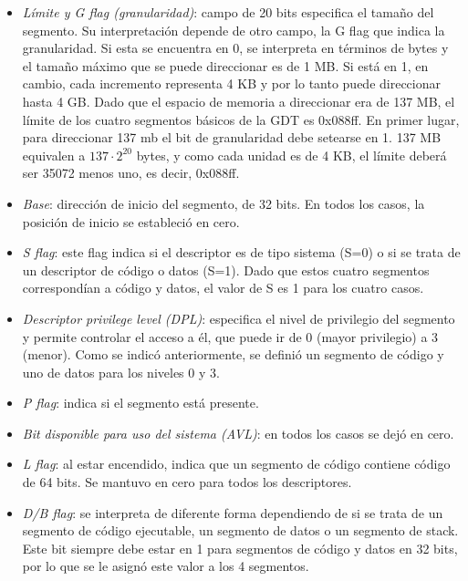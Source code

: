\documentclass[a4paper]{article}
\begin{document}
\begin{itemize}
\item \textit{Límite y G flag (granularidad)}: campo de 20 bits especifica el tamaño del segmento. Su interpretación depende de otro campo, la G flag que indica la granularidad. Si esta se encuentra en 0, se interpreta en términos de bytes y el tamaño máximo que se puede direccionar es de 1 MB. Si está en 1, en cambio, cada incremento representa 4 KB y por lo tanto puede direccionar hasta 4 GB. Dado que el espacio de memoria a direccionar era de 137 MB, el límite de los cuatro segmentos básicos de la GDT es 0x088ff. En primer lugar, para direccionar 137 mb el bit de granularidad debe setearse en 1. 137 MB equivalen a $137\cdot2^{20}$ bytes, y como cada unidad es de 4 KB, el límite deberá ser 35072 menos uno, es decir, 0x088ff.
\item \textit{Base}: dirección de inicio del segmento, de 32 bits. En todos los casos, la posición de inicio se estableció en cero.
\item \textit{S flag}: este flag indica si el descriptor es de tipo sistema (S=0) o si se trata de un descriptor de código o datos (S=1). Dado que estos cuatro segmentos correspondían a código y datos, el valor de S es 1 para los cuatro casos.
\item \textit{Descriptor privilege level (DPL)}: especifica el nivel de privilegio del segmento y permite controlar el acceso a él, que puede ir de 0 (mayor privilegio) a 3 (menor). Como se indicó anteriormente, se definió un segmento de código y uno de datos para los niveles 0 y 3.
\item \textit{P flag}: indica si el segmento está presente.
\item \textit{Bit disponible para uso del sistema (AVL)}: en todos los casos se dejó en cero.
\item \textit{L flag}: al estar encendido, indica que un segmento de código contiene código de 64 bits. Se mantuvo en cero para todos los descriptores.
\item \textit{D/B flag}: se interpreta de diferente forma dependiendo de si se trata de un segmento de código ejecutable, un segmento de datos o un segmento de stack. Este bit siempre debe estar en 1 para segmentos de código y datos en 32 bits, por lo que se le asignó este valor a los 4 segmentos. 

\end{itemize}
\end{document}
